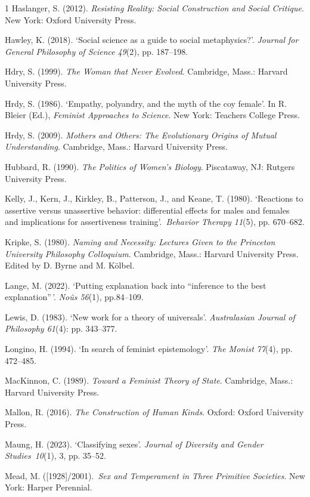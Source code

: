 \begin{hangparas}{\hangingindent}{1}
Haslanger, S. (2012). \emph{Resisting Reality: Social Construction and
Social Critique}. New York: Oxford University Press.

Hawley, K. (2018). `Social science as a guide to social metaphysics?'.
\emph{Journal for General Philosophy of Science} \emph{49}(2), pp.
187--198.

Hdry, S. (1999). \emph{The Woman that Never Evolved}. Cambridge, Mass.:
Harvard University Press.

Hrdy, S. (1986). `Empathy, polyandry, and the myth of the coy female'.
In R. Bleier (Ed.), \emph{Feminist Approaches to Science}. New York:
Teachers College Press.

Hrdy, S. (2009). \emph{Mothers and Others: The Evolutionary Origins of
Mutual Understanding}. Cambridge, Mass.: Harvard University Press.

Hubbard, R. (1990). \emph{The Politics of Women's Biology}. Piscataway,
NJ: Rutgers University Press.

Kelly, J., Kern, J., Kirkley, B., Patterson, J., and Keane, T. (1980).
`Reactions to assertive versus unassertive behavior: differential
effects for males and females and implications for assertiveness
training'.~\emph{Behavior Therapy 11}(5), pp. 670--682.

Kripke, S. (1980). \emph{Naming and Necessity: Lectures Given to the
Princeton University Philosophy Colloquium}. Cambridge, Mass.: Harvard
University Press. Edited by D. Byrne and M. Kölbel.

Lange, M. (2022). `Putting explanation back into ``inference to the best
explanation''\,'. \emph{Noûs 56}(1), pp.84--109.

Lewis, D. (1983). `New work for a theory of universals'.
\emph{Australasian Journal of Philosophy 61}(4): pp. 343--377.

Longino, H. (1994). `In search of feminist epistemology'. \emph{The
Monist} \emph{77}(4), pp. 472--485.

MacKinnon, C. (1989). \emph{Toward a Feminist Theory of State}.
Cambridge, Mass.: Harvard University Press.

Mallon, R. (2016). \emph{The Construction of Human Kinds}. Oxford:
Oxford University Press.

Maung, H. (2023). `Classifying sexes'. \emph{Journal of Diversity and
Gender Studies}~\emph{10}(1), 3, pp. 35--52.

Mead, M. ({[}1928{]}/2001).~\emph{Sex and Temperament in Three Primitive
Societies}. New York: Harper Perennial.


\end{hangparas}
